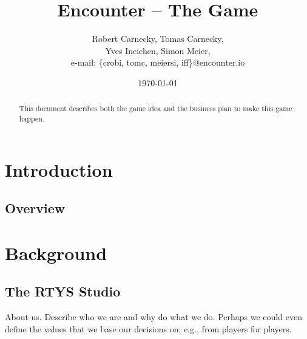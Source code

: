 \documentclass[10pt]{scrartcl}
\begin{document}
\newcommand{\FIX}[1]{}
\newcommand{\FIXN}[2]{}
\newcommand{\yves}[1]{\FIXN{YI}{#1}}
\newcommand{\simon}[1]{\FIXN{SM}{#1}}
\newcommand{\tomc}[1]{\FIXN{TC}{#1}}
\newcommand{\crobi}[1]{\FIXN{RC}{#1}}
\renewcommand{\FIX}[1]{\footnote{#1}}
\renewcommand{\FIXN}[2]{\FIX{{\bf #1:} #2}}

\newcommand{\ie}{i.e.\xspace}
\newcommand{\st}{s.t.\xspace}
\newcommand{\eg}{e.g.\xspace}
\newcommand{\etc}{etc.\xspace}
\newcommand{\wrt}{w.r.t.\xspace}
\newcommand{\etal}{et.~al.\xspace}

\title{
  Encounter -- The Game
}

\author{
  Robert Carnecky,
  Tomas Carnecky,\\
  Yves Ineichen,
  Simon Meier,\\
  e-mail: \{crobi, tomc, meiersi, iff\}@encounter.io
}

\date{\today}
\maketitle


\begin{abstract}
This document describes both the game idea
  and the business plan to make this game happen.
\end{abstract}

\section{Introduction}

\subsection{Overview}



\section{Background}

\subsection{The RTYS Studio}

About us.
Describe who we are and why do what we do.
Perhaps we could even define the values that we base our decisions on;
  \eg, from players for players.
\end{document}
